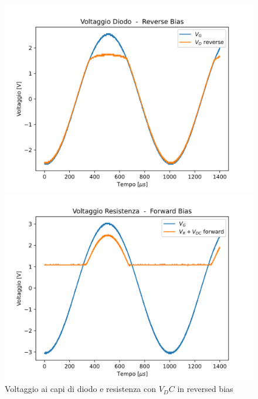 \begin{figure}
    \begin{minipage}{0.475\textwidth}
        \includegraphics[width=1\textwidth]{Diodo 3.2.(4-5)/DC_V_D_Reverse.png}
    \end{minipage}
    \hfill
    \begin{minipage}{0.475\textwidth}
        \includegraphics[width=1\textwidth]{Diodo 3.2.(4-5)/DC_V_R_Forward.png}
    \end{minipage}
    \label{3.2.5}
    \caption{Voltaggio ai capi di diodo e resistenza con $V_DC$ in reversed bias}
\end{figure}

